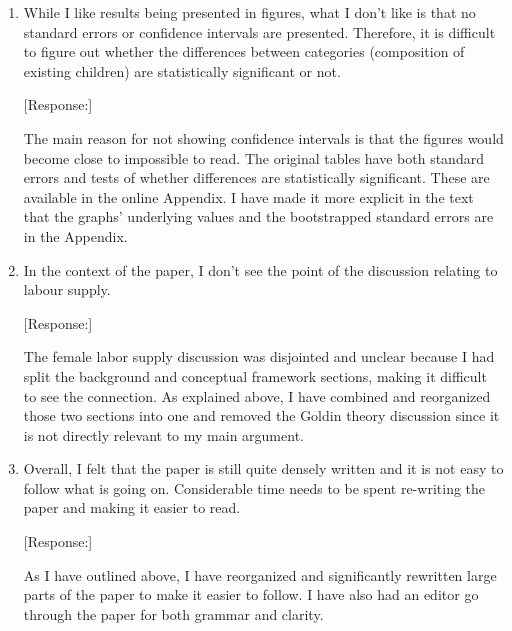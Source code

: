 \documentclass[letterpaper,12pt]{article}
\begin{document}
\begin{enumerate}
[Response:]

The 2004 break is an attempt to understand whether we observe the beginning of
a reversal in son preference and the use of sex selection as hypothesized by part of
the prior literature.
In the ``Data'' section, I have split the paragraph on the periods into two and expanded 
the discussion of the motivation for the breaks, including adding two additional
references arguing that we might see the reversal.
The 2004/2005 break is somewhat arbitrary but does have the advantage of making 
the periods close to the same length (there are relatively few birth intervals that begin 
in 2015 and 2016).

I now discuss the changes between the last two periods in more detail in the 
subsection on birth spacing with sex selection and the Conclusion.

\item While I like results being presented in figures, what I don’t like
is that no standard errors or confidence intervals are presented.
Therefore, it is difficult to figure out whether the differences between
categories (composition of existing children) are statistically
significant or not.

[Response:]

The main reason for not showing confidence intervals is that the figures would become close 
to impossible to read. 
The original tables have both standard errors and tests of whether differences are 
statistically significant. 
These are available in the online Appendix. 
I have made it more explicit in the text that the graphs' underlying values and the 
bootstrapped standard errors are in the Appendix.

\item In the context of the paper, I don’t see the point of the
discussion relating to labour supply.

[Response:]

The female labor supply discussion was disjointed and unclear because I had split the 
background and conceptual framework sections, making it diﬀicult to see the connection. 
As explained above, I have combined and reorganized those two sections into one and removed 
the Goldin theory discussion since it is not directly relevant to my main argument.

\item Overall, I felt that the paper is still quite densely written and
it is not easy to follow what is going on. Considerable time needs to be
spent re-writing the paper and making it easier to read.

[Response:]

As I have outlined above, I have reorganized and significantly rewritten large parts of 
the paper to make it easier to follow. 
I have also had an editor go through the paper for both grammar and clarity.

\end{enumerate}



\newpage


\end{document}
